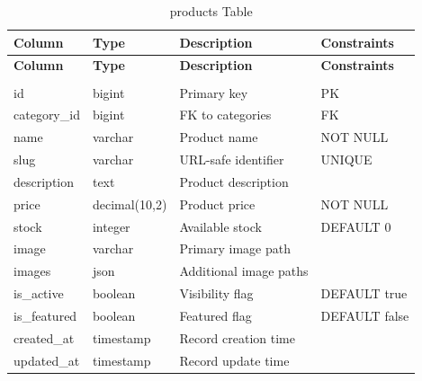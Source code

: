\renewcommand{\arraystretch}{1.3}
\begin{longtable}{|p{3cm}|p{3cm}|p{4cm}|p{3cm}|}
    \hline
    \textbf{Column} & \textbf{Type} & \textbf{Description} & \textbf{Constraints} \\
    \hline
    \endfirsthead
    \hline
    \textbf{Column} & \textbf{Type} & \textbf{Description} & \textbf{Constraints} \\
    \hline
    \endhead
    \hline
    \endfoot
    \hline
    \caption{products Table} \label{tab:products} \\
    \endlastfoot
    id & bigint & Primary key & PK \\
    \hline
    category\_id & bigint & FK to categories & FK \\
    \hline
    name & varchar & Product name & NOT NULL \\
    \hline
    slug & varchar & URL-safe identifier & UNIQUE \\
    \hline
    description & text & Product description & \\
    \hline
    price & decimal(10,2) & Product price & NOT NULL \\
    \hline
    stock & integer & Available stock & DEFAULT 0 \\
    \hline
    image & varchar & Primary image path & \\
    \hline
    images & json & Additional image paths & \\
    \hline
    is\_active & boolean & Visibility flag & DEFAULT true \\
    \hline
    is\_featured & boolean & Featured flag & DEFAULT false \\
    \hline
    created\_at & timestamp & Record creation time & \\
    \hline
    updated\_at & timestamp & Record update time & \\
    \hline
\end{longtable}

